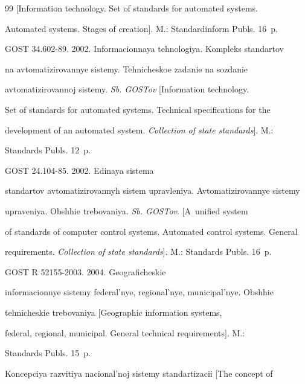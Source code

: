 {{\begin{thebibliography}{99}
[Information technology. Set of standards for automated systems. 


Automated systems. Stages of creation]. M.: Standardinform Publs. 16~p. 







GOST 34.602-89. 2002. Informacionnaya tehnologiya. Kompleks standartov 


na avto\-ma\-ti\-zi\-ro\-vannye sistemy. Tehnicheskoe zadanie na sozdanie 


avtomatizirovannoj sistemy. \textit{Sb. GOSTov} [Information technology. 


Set of standards for automated systems. Technical specifications for the 


development of an automated system. \textit{Collection of state standards}].  M.: 


Standards Publs. 12~p. 







GOST 24.104-85. 2002. Edinaya sistema 


standartov avtomatizirovannyh sistem upravleniya. Avtomatizirovannye sistemy 


upraveniya. Obshhie trebovaniya. \textit{Sb. GOSTov}. [A~unified system 


of standards of computer control systems. Automated control systems. General 


requirements. \textit{Collection of state standards}]. M.: Standards Publs.  16~p. 







GOST R 52155-2003. 2004. Geograficheskie 


informacionnye sistemy federal'nye, regional'nye, municipal'nye. Obshhie 


tehnicheskie trebovaniya [Geographic information systems, 


federal, regional, municipal. General technical requirements].  M.: 


Standards Publs. 15~p.







Koncepciya razvitiya nacional'noj sistemy standartizacii [The concept of 



\end{thebibliography}}}
